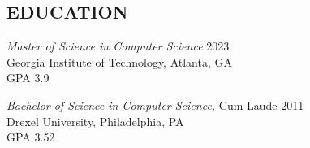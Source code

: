 \documentclass[line]{style}
\begin{document}
\begin{resume}
\section{EDUCATION}
{\sl Master of Science in Computer Science} \hfill 2023 \\
Georgia Institute of Technology, Atlanta, GA \\
GPA 3.9

{\sl Bachelor of Science in Computer Science,} Cum Laude \hfill 2011 \\
Drexel University, Philadelphia, PA \\
GPA 3.52

\end{resume}
\end{document}
